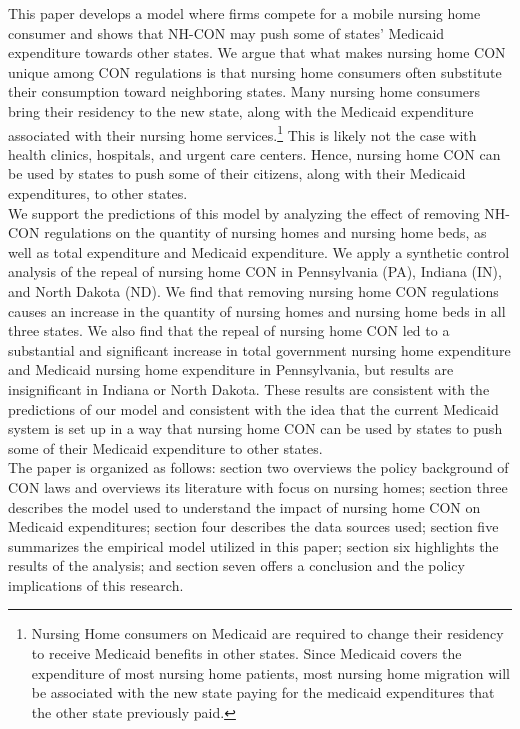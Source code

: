 \documentclass[../Main.tex]{subfiles}
\begin{document}
\indent This paper develops a model where firms compete for a mobile nursing home consumer and shows that NH-CON may push some of states’ Medicaid expenditure towards other states. We argue that what makes nursing home CON unique among CON regulations is that nursing home consumers often substitute their consumption toward neighboring states. Many nursing home consumers bring their residency to the new state, along with the Medicaid expenditure associated with their nursing home services.\footnote{Nursing Home consumers on Medicaid are required to change their residency to receive Medicaid benefits in other states. Since Medicaid covers the expenditure of most nursing home patients, most nursing home migration will be associated with the new state paying for the medicaid expenditures that the other state previously paid.} This is likely not the case with health clinics, hospitals, and urgent care centers. Hence, nursing home CON can be used by states to  push some of their citizens, along with their Medicaid expenditures, to other states.\\
\indent We support the predictions of this model by analyzing the effect of removing NH-CON regulations on the quantity of nursing homes and nursing home beds, as well as total expenditure and Medicaid expenditure. We apply a synthetic control analysis of the repeal of nursing home CON in Pennsylvania (PA), Indiana (IN), and North Dakota (ND). We find that removing nursing home CON regulations causes an increase in the quantity of nursing homes and nursing home beds in all three states. We also find that the repeal of nursing home CON led to a substantial and significant increase in total government nursing home expenditure and Medicaid nursing home expenditure in Pennsylvania, but results are insignificant in Indiana or North Dakota. These results are consistent with the predictions of our model and consistent with the idea that the current Medicaid system is set up in a way that nursing home CON can be used by states to push some of their Medicaid expenditure to other states. \\
\indent The paper is organized as follows: section two overviews the policy background of CON laws and overviews its literature with focus on nursing homes; section three describes the model used to understand the impact of nursing home CON on Medicaid expenditures; section four describes the data sources used; section five summarizes the empirical model utilized in this paper; section six highlights the results of the analysis; and section seven offers a conclusion and the policy implications of this research.
\end{document}
